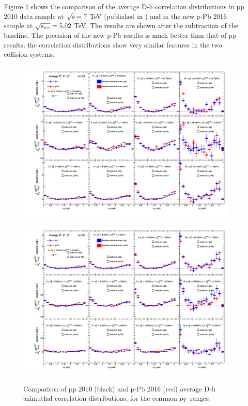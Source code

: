 Figure \ref{fig:CfrppCorrel} shows the comparison of the average D-h correlation distributions in pp 2010 data sample at $\rm{\sqrt{s}= 7}$ TeV (published in \cite{ALICEDhcorr}) and in the new p-Pb 2016 sample at $\rm{\sqrt{s_{\rm \scriptscriptstyle NN}}= 5.02}$ TeV. The results are shown after the subtraction of the baseline. The precision of the new p-Pb results is much better than that of pp results; the correlation distributions show very similar features in the two collision systems. 

\begin{figure}[!htbp]
\centering
{\includegraphics[width=1.3\textwidth, angle=90]{figures/CfrPPandModels/plotComparison_WeightedAverage_pp_pPb_UniqueCanvas_Style1_1.png}}
\end{figure}
\begin{figure}[!htbp]
\centering
{\includegraphics[width=1.3\textwidth, angle=90]{figures/CfrPPandModels/plotComparison_WeightedAverage_pp_pPb_UniqueCanvas_Style1_2.png}}
\caption{Comparison of pp 2010 (black) and p-Pb 2016 (red) average D-h azimuthal correlation distributions, for the common $p_{\rm T}$ ranges.}
\label{fig:CfrppCorrel}
\end{figure}

